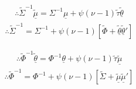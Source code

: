 \documentclass[fleqn]{minimal}
\begin{document}
\begin{align*}
  \therefore
  \tilde{\Sigma}^{-1}\underline{\tilde{\mu}}
  =
  \Sigma^{-1}\underline{\mu}
  + \psi\left(\nu-1\right)
  \tilde{\tau}\underline{\tilde{\theta}}
\end{align*}
\begin{align*}
  \therefore
  \tilde{\Sigma}^{-1}
  =
  \Sigma^{-1} 
  + \psi\left(\nu-1\right)
  \left[
    \tilde{\Phi}
    + \underline{\tilde{\theta}}\underline{\tilde{\theta}}'
  \right]
\end{align*}

\begin{align*}
  \therefore
  \tilde{\Phi}^{-1}\underline{\tilde{\theta}}
  =
  \Phi^{-1}\underline{\theta}
  + \psi\left(\nu-1\right)
  \tilde{\tau}\underline{\tilde{\mu}}
\end{align*}
\begin{align*}
  \therefore
  \tilde{\Phi}^{-1}
  =
  \Phi^{-1} 
  + \psi\left(\nu-1\right)
  \left[
    \tilde{\Sigma}
    + \underline{\tilde{\mu}}\underline{\tilde{\mu}}'
  \right]
\end{align*}
\end{document}
